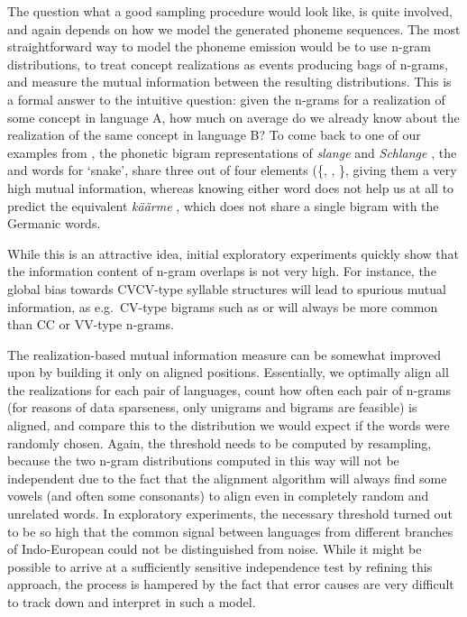 The question what a good sampling procedure would look like, is quite involved, and again depends on how we model the generated phoneme sequences. The most straightforward way to model the phoneme emission would be to use n-gram distributions, to treat concept realizations as events producing bags of n-grams, and measure the mutual information between the resulting distributions. This is a formal answer to the intuitive question: given the n-grams for a realization of some concept in language A, how much on average do we already know about the realization of the same concept in language B? To come back to one of our examples from , the phonetic bigram representations of \textit{slange} \UIPA{[slɑŋə]} and \textit{Schlange} \UIPA{[ʃlɑŋə]}, the  and  words for `snake', share three out of four elements (\{\UIPA{[lɑ]}, \UIPA{[ɑŋ]}, \UIPA{[ŋə]}\}, giving them a very high mutual information, whereas knowing either word does not help us at all to predict the  equivalent \textit{käärme} \UIPA{[kæærmɛ]}, which does not share a single bigram with the Germanic words.

While this is an attractive idea, initial exploratory experiments quickly show that the information content of n-gram overlaps is not very high. For instance, the global bias towards CVCV-type syllable structures will lead to spurious mutual information, as e.g.\ CV-type bigrams such as \UIPA{[pa]} or \UIPA{[ku]} will always be more common than CC or VV-type n-grams.

The realization-based mutual information measure can be somewhat improved upon by building it only on aligned positions. Essentially, we optimally align all the realizations for each pair of languages, count how often each pair of n-grams (for reasons of data sparseness, only unigrams and bigrams are feasible) is aligned, and compare this to the distribution we would expect if the words were randomly chosen. Again, the threshold needs to be computed by resampling, because the two n-gram distributions computed in this way will not be independent due to the fact that the alignment algorithm will always find some vowels (and often some consonants) to align even in completely random and unrelated words. In exploratory experiments, the necessary threshold turned out to be so high that the common signal between languages from different branches of Indo-European could not be distinguished from noise. While it might be possible to arrive at a sufficiently sensitive independence test by refining this approach, the process is hampered by the fact that error causes are very difficult to track down and interpret in such a model.

